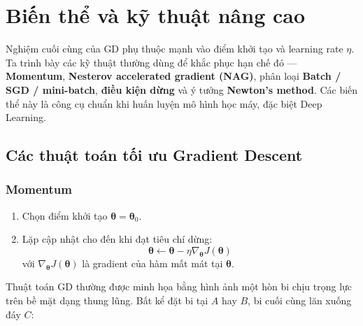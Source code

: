 \section{Biến thể và kỹ thuật nâng cao}
\label{sec:gd-part2}

\begin{ynghia}[title={Mở đầu}]
Nghiệm cuối cùng của GD phụ thuộc mạnh vào điểm khởi tạo và learning rate $\eta$. Ta trình bày các kỹ thuật thường dùng để khắc phục hạn chế đó --- \textbf{Momentum}, \textbf{Nesterov accelerated gradient (NAG)}, phân loại \textbf{Batch / SGD / mini-batch}, \textbf{điều kiện dừng} và ý tưởng \textbf{Newton's method}. Các biến thể này là công cụ chuẩn khi huấn luyện mô hình học máy, đặc biệt Deep Learning.
\end{ynghia}

\subsection{Các thuật toán tối ưu Gradient Descent}
\label{subsec:gd-opt-algos}

\subsubsection{Momentum}

\begin{phuongphap}[title={Nhắc lại thuật toán Gradient Descent}]
\begin{enumerate}
 \item Chọn điểm khởi tạo $\boldsymbol{\theta} = \boldsymbol{\theta}_0$.
 \item Lặp cập nhật cho đến khi đạt tiêu chí dừng:
 \[
 \boldsymbol{\theta} \leftarrow \boldsymbol{\theta} - \eta \nabla_{\boldsymbol{\theta}}J(\boldsymbol{\theta})
 \]
 với $\nabla_{\boldsymbol{\theta}}J(\boldsymbol{\theta})$ là gradient của hàm mất mát tại $\boldsymbol{\theta}$.
\end{enumerate}
\end{phuongphap}

\begin{ynghia}[title={Ẩn dụ vật lý: hòn bi trên bề mặt lồi}]
Thuật toán GD thường được minh họa bằng hình ảnh một hòn bi chịu trọng lực trên bề mặt dạng thung lũng. Bất kể đặt bi tại $A$ hay $B$, bi cuối cùng lăn xuống đáy $C$:

\end{ynghia}

